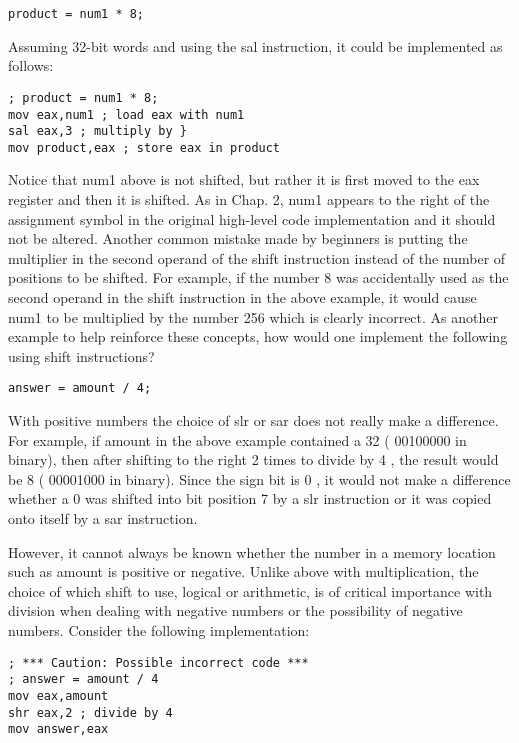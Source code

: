 \documentclass[10pt]{article}
\begin{document}
\begin{verbatim}
product = num1 * 8;
\end{verbatim}

Assuming 32-bit words and using the sal instruction, it could be implemented as follows:

\begin{verbatim}
; product = num1 * 8;
mov eax,num1 ; load eax with num1
sal eax,3 ; multiply by }
mov product,eax ; store eax in product
\end{verbatim}

Notice that num1 above is not shifted, but rather it is first moved to the eax register and then it is shifted. As in Chap. 2, num1 appears to the right of the assignment symbol in the original high-level code implementation and it should not be altered. Another common mistake made by beginners is putting the multiplier in the second operand of the shift instruction instead of the number of positions to be shifted. For example, if the number 8 was accidentally used as the second operand in the shift instruction in the above example, it would cause num1 to be multiplied by the number 256 which is clearly incorrect. As another example to help reinforce these concepts, how would one implement the following using shift instructions?

\begin{verbatim}
answer = amount / 4;
\end{verbatim}

With positive numbers the choice of slr or sar does not really make a difference. For example, if amount in the above example contained a 32 ( 00100000 in binary), then after shifting to the right 2 times to divide by 4 , the result would be 8 ( 00001000 in binary). Since the sign bit is 0 , it would not make a difference whether a 0 was shifted into bit position 7 by a slr instruction or it was copied onto itself by a sar instruction.

However, it cannot always be known whether the number in a memory location such as amount is positive or negative. Unlike above with multiplication, the choice of which shift to use, logical or arithmetic, is of critical importance with division when dealing with negative numbers or the possibility of negative numbers. Consider the following implementation:

\begin{verbatim}
; *** Caution: Possible incorrect code ***
; answer = amount / 4
mov eax,amount
shr eax,2 ; divide by 4
mov answer,eax
\end{verbatim}
\end{document}
